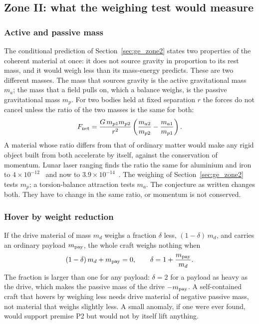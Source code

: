\subsection{Zone II: what the weighing test would measure}\label{sec:pr_weigh}

\subsubsection{Active and passive mass}
The conditional prediction of Section~\ref{sec:ge_zone2} states two properties of the coherent material at once: it does not source gravity in
proportion to its rest mass, and it would weigh less than its mass-energy predicts. These are two different masses. The mass that sources gravity is
the active gravitational mass $m_a$; the mass that a field pulls on, which a balance weighs, is the passive gravitational mass $m_p$. For two bodies
held at fixed separation $r$ the forces do not cancel unless the ratio of the two masses is the same for both:
\begin{equation}
F_{\rm net}=\frac{G\,m_{p1}m_{p2}}{r^2}\left(\frac{m_{a2}}{m_{p2}}-\frac{m_{a1}}{m_{p1}}\right) .
\label{eq:pr_selfforce}
\end{equation}
\derived{} A material whose ratio differs from that of ordinary matter would make any rigid object built from both accelerate by itself, against the
conservation of momentum. Lunar laser ranging finds the ratio the same for aluminium and iron to $4\times10^{-12}$~\cite{BartlettVanBuren1986} and
now to $3.9\times10^{-14}$~\cite{Singh2023}. \observed{} The weighing of Section~\ref{sec:ge_zone2} tests $m_p$; a torsion-balance attraction tests
$m_a$. The conjecture as written changes both. \conjecture{} They have to change in the same ratio, or momentum is not conserved. \derived

\subsubsection{Hover by weight reduction}
If the drive material of mass $m_d$ weighs a fraction $\delta$ less, $(1-\delta)\,m_d$, and carries an ordinary payload $m_{\rm pay}$, the whole
craft weighs nothing when
\begin{equation}
(1-\delta)\,m_d+m_{\rm pay}=0,\qquad \delta=1+\frac{m_{\rm pay}}{m_d} .
\label{eq:pr_hover}
\end{equation}
\derived{} The fraction is larger than one for any payload: $\delta=2$ for a payload as heavy as the drive, which makes the passive mass of the drive
$-m_{\rm pay}$. A self-contained craft that hovers by weighing less needs drive material of negative passive mass, not material that weighs slightly
less. \derived{} A small anomaly, if one were ever found, would support premise P2 but would not by itself lift anything. \conjecture

